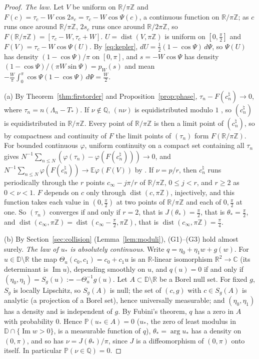 \documentclass[11pt]{amsart}
\theoremstyle{definition}
\theoremstyle{remark}
\numberwithin{equation}{section}
\newcommand{\C}{\mathbb{C}}
\newcommand{\R}{\mathbb{R}}
\newcommand{\Q}{\mathbb{Q}}
\newcommand{\Z}{\mathbb{Z}}
\newcommand{\D}{\mathbb{D}}
\newcommand{\E}{\mathbb{E}}
\newcommand{\PP}{\mathbb{P}}
\DeclareMathOperator{\im}{Im}
\DeclareMathOperator{\dist}{dist}
\begin{document}
\begin{proof}
\emph{The law.} Let $V$ be uniform on $\R/\pi\Z$ and $F(c)=\tau_c-W\cos2s_c=\tau_c-W\cos\Psi(c)$, a continuous function on
$\R/\pi\Z$; as $c$ runs once around $\R/\pi\Z$, $2s_c$ runs once around $\R/2\pi\Z$, so $F(\R/\pi\Z)=[\tau_c-W,\tau_c+W]$.
$U=\dist(V,\pi\Z)$ is uniform on $[0,\frac\pi2]$ and $F(V)=\tau_c-W\cos\Psi(U)$. By \eqref{eq:kepler},
$dU=\frac12(1-\cos\Psi)\,d\Psi$, so $\Psi(U)$ has density $(1-\cos\Psi)/\pi$ on $[0,\pi]$, and $s=-W\cos\Psi$ has density
$(1-\cos\Psi)/(\pi W\sin\Psi)=p_W(s)$ and mean $-\frac W\pi\int_0^\pi\cos\Psi(1-\cos\Psi)\,d\Psi=\frac W2$.

(a) By Theorem~\ref{thm:firstorder} and Proposition~\ref{prop:phase}, $\tau_n-F(c_n^\natural)\to0$, where
$\tau_n=n(\Lambda_n-T_*)$. If $\nu\notin\Q$, $(n\nu)$ is equidistributed modulo $1$ \cite[Ch.~1, Example~2.1]{KN}, so
$(c_n^\natural)$ is equidistributed in $\R/\pi\Z$. Every point of $\R/\pi\Z$ is then a limit point of $(c_n^\natural)$, so by
compactness and continuity of $F$ the limit points of $(\tau_n)$ form $F(\R/\pi\Z)$. For bounded continuous $\varphi$,
uniform continuity on a compact set containing all $\tau_n$ gives $N^{-1}\sum_{n\le N}(\varphi(\tau_n)-\varphi(F(c_n^\natural)))\to0$,
and $N^{-1}\sum_{n\le N}\varphi(F(c_n^\natural))\to\E\varphi(F(V))$ by \cite[Ch.~1, Corollary~1.2]{KN}. If
$\nu=p/r$, then $c_n^\natural$ runs periodically through the $r$ points $c_\infty-j\pi/r$ of $\R/\pi\Z$, $0\le j<r$, and
$r\ge2$ as $0<\nu<1$. $F$ depends on $c$ only through $\dist(c,\pi\Z)$, injectively, and this function takes each value in
$(0,\frac\pi2)$ at two points of $\R/\pi\Z$ and each of $0,\frac\pi2$ at one. So $(\tau_n)$ converges if and only if $r=2$,
that is $J(\theta_*)=\frac\pi2$, that is $\theta_*=\frac\pi2$, and $\dist(c_\infty,\pi\Z)=\dist(c_\infty-\frac\pi2,\pi\Z)$,
that is $\dist(c_\infty,\pi\Z)=\frac\pi4$.

(b) By Section~\ref{sec:collision} (Lemma~\ref{lem:moduli}), (G1)--(G3) hold almost surely. \emph{The law of $u_*$ is
absolutely continuous.} Write $q=\eta_0+\eta_1w+g(w)$. For $u\in\D\setminus\R$ the map $\Theta_u(c_0,c_1)=c_0+c_1u$ is
an $\R$-linear isomorphism $\R^2\to\C$ (its determinant is $\im u$), depending smoothly on $u$, and $q(u)=0$ if and only if
$(\eta_0,\eta_1)=S_g(u):=-\Theta_u^{-1}g(u)$. Let $A\subset\D\setminus\R$ be a Borel null set. For fixed $g$, $S_g$ is
locally Lipschitz, so $S_g(A)$ is null; the set of $(c,g)$ with $c\in S_g(A)$ is analytic (a projection of a Borel set),
hence universally measurable; and $(\eta_0,\eta_1)$ has a density and is independent of $g$. By Fubini's theorem,
$q$ has a zero in $A$ with probability $0$. Hence $\PP(u_*\in A)=0$ ($u_*$, the zero of least modulus in $\D\cap\{\im w>0\}$, is a measurable function of $q$),
$\theta_*=\arg u_*$ has a density on $(0,\pi)$, and
so has $\nu=J(\theta_*)/\pi$, since $J$ is a diffeomorphism of $(0,\pi)$ onto itself. In particular $\PP(\nu\in\Q)=0$.


\end{proof}
\end{document}
